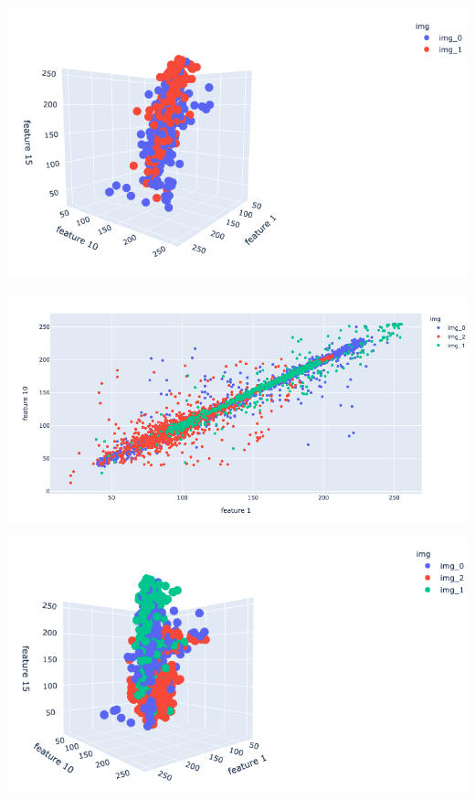 \documentclass{article}
\begin{document}
\begin{multicols}{2}
	\centering
		\includegraphics[scale=0.25]{../screenshots/3d01.png}
	
	\centering
	\includegraphics[scale=0.2]{../screenshots/2d012.png}
	
	\centering
		\includegraphics[scale=0.25]{../screenshots/3d012.png}
\end{multicols}
\end{document}
